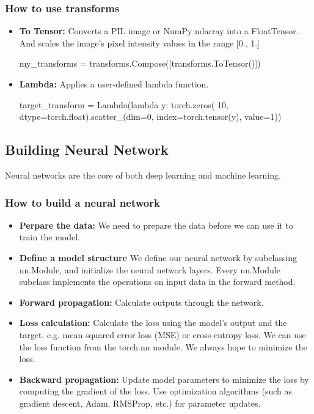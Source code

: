 \documentclass[12pt,hyperref,a4paper,UTF8]{article}
\begin{document}
\subsubsection{How to use transforms}
\begin{itemize}
\item \textbf{To Tensor:} Converts a PIL image or NumPy ndarray into a FloatTensor. And scales the image's pixel intensity values in the range [0., 1.]
\begin{python}
    my_transforms = transforms.Compose([transforms.ToTensor()])
\end{python}
\item \textbf{Lambda:} Applies a user-defined lambda function.
\begin{python}
    target_transform = Lambda(lambda y: torch.zeros(
        10, dtype=torch.float).scatter_(dim=0, index=torch.tensor(y), value=1))
\end{python}
\end{itemize}
\newpage

\subsection{Building Neural Network}
\textbf{} Neural networks are the core of both deep learning and machine learning.
\subsubsection{How to build a neural network}
\begin{itemize}
    \item \textbf{Perpare the data:} We need to prepare the data before we can use it to train the model.
    \item \textbf{Define a model structure} We define our neural network by subclassing nn.Module, and initialize the neural network layers. Every nn.Module subclass implements the operations on input data in the forward method.
    \item \textbf{Forward propagation:}  Calculate outputs through the network.
    \item \textbf{Loss calculation:} Calculate the loss using the model's output and the target. e.g. mean squared error loss (MSE) or cross-entropy loss. We can use the loss function from the torch.nn module. We always hope to minimize the loss.
    \item \textbf{Backward propagation:}  Update model parameters to minimize the loss by computing the gradient of the loss. Use optimization algorithms (such as gradient descent, Adam, RMSProp, etc.) for parameter updates.
\end{itemize}
\end{document}
